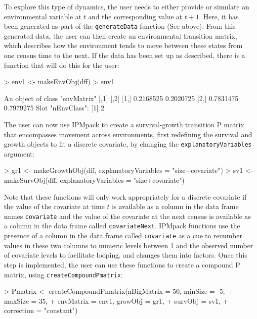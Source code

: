 \documentclass{article}
\begin{document}
To explore this type of dynamics, the user needs to either provide or simulate an environmental variable at $t$ and the corresponding value at $t+1$. Here, it has been generated as part of the {\tt generateData} function (See above). From this generated data, the user can then create an environmental transition matrix, which describes how the environment tends to move between these states from one census time to the next. If the data has been set up as described, there is a function that will do this for the user: 
\begin{Schunk}
\begin{Sinput}
> env1 <- makeEnvObj(dff) 
> env1
\end{Sinput}
\begin{Soutput}
An object of class "envMatrix"
          [,1]      [,2]
[1,] 0.2168525 0.2020725
[2,] 0.7831475 0.7979275
Slot "nEnvClass":
[1] 2
\end{Soutput}
\end{Schunk}
The user can now use IPMpack to create a survival-growth transition P matrix that encompasses movement across environments, first redefining the survival and growth
objects to fit a discrete covariate, by changing the {\tt explanatoryVariables} argument: 
\begin{Schunk}
\begin{Sinput}
> gr1 <- makeGrowthObj(dff, explanatoryVariables = "size+covariate")
> sv1 <- makeSurvObj(dff, explanatoryVariables = "size+covariate")
\end{Sinput}
\end{Schunk}
Note that these functions will only work appropriately for a discrete covariate if the value of the covariate at time $t$ is available as a column in the data frame names {\tt covariate} and the value of the covariate at the next census is available as a column in the data frame called {\tt covariateNext}. IPMpack functions use the presence of a column in the data frame called {\tt covariate} as a cue to renumber values in these two columns to numeric levels between 1 and the observed number of covariate levels to facilitate looping, and changes them into factors. Once this step is implemented, the user can use these functions to create a compound P matrix, using {\tt createCompoundPmatrix}: 
\begin{Schunk}
\begin{Sinput}
> Pmatrix <- createCompoundPmatrix(nBigMatrix = 50, minSize = -5, 
+                                  maxSize = 35, 
+                                  envMatrix = env1, growObj = gr1, 
+                                  survObj = sv1, 
+                                  correction = "constant")
\end{Sinput}
\end{Schunk}
\end{document}
